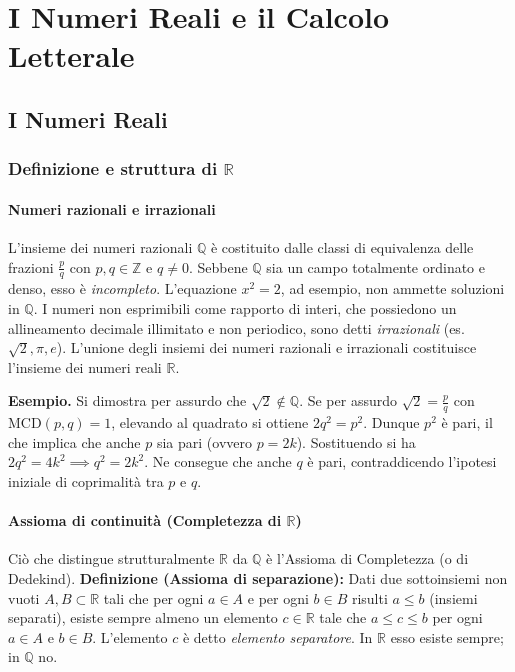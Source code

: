 \chapter{I Numeri Reali e il Calcolo Letterale}

\section{I Numeri Reali}
\subsection{Definizione e struttura di $\mathbb{R}$}
\subsubsection{Numeri razionali e irrazionali}
L'insieme dei numeri razionali $\mathbb{Q}$ è costituito dalle classi di equivalenza delle frazioni $\frac{p}{q}$ con $p,q \in \mathbb{Z}$ e $q \neq 0$. Sebbene $\mathbb{Q}$ sia un campo totalmente ordinato e denso, esso è \textit{incompleto}. L'equazione $x^2 = 2$, ad esempio, non ammette soluzioni in $\mathbb{Q}$.
I numeri non esprimibili come rapporto di interi, che possiedono un allineamento decimale illimitato e non periodico, sono detti \textit{irrazionali} (es. $\sqrt{2}, \pi, e$). L'unione degli insiemi dei numeri razionali e irrazionali costituisce l'insieme dei numeri reali $\mathbb{R}$.

\textbf{Esempio.} Si dimostra per assurdo che $\sqrt{2} \notin \mathbb{Q}$. Se per assurdo $\sqrt{2} = \frac{p}{q}$ con $\text{MCD}(p,q)=1$, elevando al quadrato si ottiene $2q^2 = p^2$. Dunque $p^2$ è pari, il che implica che anche $p$ sia pari (ovvero $p=2k$). Sostituendo si ha $2q^2 = 4k^2 \implies q^2 = 2k^2$. Ne consegue che anche $q$ è pari, contraddicendo l'ipotesi iniziale di coprimalità tra $p$ e $q$.

\subsubsection{Assioma di continuità (Completezza di $\mathbb{R}$)}
Ciò che distingue strutturalmente $\mathbb{R}$ da $\mathbb{Q}$ è l'Assioma di Completezza (o di Dedekind). 
\textbf{Definizione (Assioma di separazione):} Dati due sottoinsiemi non vuoti $A, B \subset \mathbb{R}$ tali che per ogni $a \in A$ e per ogni $b \in B$ risulti $a \le b$ (insiemi separati), esiste sempre almeno un elemento $c \in \mathbb{R}$ tale che $a \le c \le b$ per ogni $a \in A$ e $b \in B$.
L'elemento $c$ è detto \textit{elemento separatore}. In $\mathbb{R}$ esso esiste sempre; in $\mathbb{Q}$ no. 

